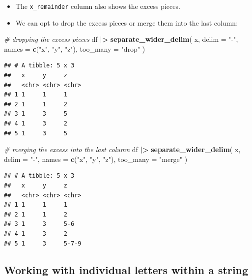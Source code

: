 \documentclass[
]{article}
\newenvironment{Shaded}{\begin{snugshade}}{\end{snugshade}}
\newcommand{\AttributeTok}[1]{\textcolor[rgb]{0.13,0.29,0.53}{#1}}
\newcommand{\CommentTok}[1]{\textcolor[rgb]{0.56,0.35,0.01}{\textit{#1}}}
\newcommand{\FunctionTok}[1]{\textcolor[rgb]{0.13,0.29,0.53}{\textbf{#1}}}
\newcommand{\NormalTok}[1]{#1}
\newcommand{\SpecialCharTok}[1]{\textcolor[rgb]{0.81,0.36,0.00}{\textbf{#1}}}
\newcommand{\StringTok}[1]{\textcolor[rgb]{0.31,0.60,0.02}{#1}}
\providecommand{\tightlist}{%
  \setlength{\itemsep}{0pt}\setlength{\parskip}{0pt}}
\begin{document}
\begin{itemize}
\tightlist
\item
  The \texttt{x\_remainder} column also shows the excess pieces.\\
\item
  We can opt to drop the excess pieces or merge them into the last
  column:
\end{itemize}

\begin{Shaded}
\begin{Highlighting}[]
\CommentTok{\# dropping the excess pieces}
\NormalTok{df }\SpecialCharTok{|\textgreater{}} 
  \FunctionTok{separate\_wider\_delim}\NormalTok{(}
\NormalTok{    x, }
    \AttributeTok{delim =} \StringTok{"{-}"}\NormalTok{,}
    \AttributeTok{names =} \FunctionTok{c}\NormalTok{(}\StringTok{"x"}\NormalTok{, }\StringTok{"y"}\NormalTok{, }\StringTok{"z"}\NormalTok{),}
    \AttributeTok{too\_many =} \StringTok{"drop"}
\NormalTok{  )}
\end{Highlighting}
\end{Shaded}

\begin{verbatim}
## # A tibble: 5 x 3
##   x     y     z    
##   <chr> <chr> <chr>
## 1 1     1     1    
## 2 1     1     2    
## 3 1     3     5    
## 4 1     3     2    
## 5 1     3     5
\end{verbatim}

\begin{Shaded}
\begin{Highlighting}[]
\CommentTok{\# merging the excess into the last column}
\NormalTok{df }\SpecialCharTok{|\textgreater{}} 
  \FunctionTok{separate\_wider\_delim}\NormalTok{(}
\NormalTok{    x,}
    \AttributeTok{delim =} \StringTok{"{-}"}\NormalTok{,}
    \AttributeTok{names =} \FunctionTok{c}\NormalTok{(}\StringTok{"x"}\NormalTok{, }\StringTok{"y"}\NormalTok{, }\StringTok{"z"}\NormalTok{),}
    \AttributeTok{too\_many =} \StringTok{"merge"}
\NormalTok{  )}
\end{Highlighting}
\end{Shaded}

\begin{verbatim}
## # A tibble: 5 x 3
##   x     y     z    
##   <chr> <chr> <chr>
## 1 1     1     1    
## 2 1     1     2    
## 3 1     3     5-6  
## 4 1     3     2    
## 5 1     3     5-7-9
\end{verbatim}

\subsection{Working with individual letters within a
string}\label{working-with-individual-letters-within-a-string}
\end{document}
